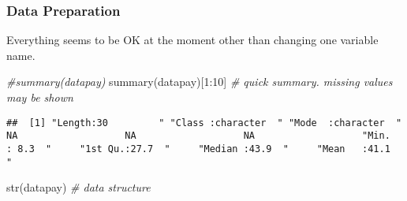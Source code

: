 \documentclass[
]{article}
\newenvironment{Shaded}{\begin{snugshade}}{\end{snugshade}}
\newcommand{\CommentTok}[1]{\textcolor[rgb]{0.56,0.35,0.01}{\textit{#1}}}
\newcommand{\DecValTok}[1]{\textcolor[rgb]{0.00,0.00,0.81}{#1}}
\newcommand{\FunctionTok}[1]{\textcolor[rgb]{0.00,0.00,0.00}{#1}}
\newcommand{\NormalTok}[1]{#1}
\newcommand{\SpecialCharTok}[1]{\textcolor[rgb]{0.00,0.00,0.00}{#1}}
\begin{document}
\frametitle{Data Preparation}

Everything seems to be OK at the moment other than changing one variable
name.\\
\tiny

\begin{Shaded}
\begin{Highlighting}[]
\CommentTok{\#summary(datapay)}
\FunctionTok{summary}\NormalTok{(datapay)[}\DecValTok{1}\SpecialCharTok{:}\DecValTok{10}\NormalTok{] }\CommentTok{\# quick summary. missing values may be shown}
\end{Highlighting}
\end{Shaded}

\begin{verbatim}
##  [1] "Length:30         " "Class :character  " "Mode  :character  " NA                   NA                   NA                   "Min.   : 8.3  "     "1st Qu.:27.7  "     "Median :43.9  "     "Mean   :41.1  "
\end{verbatim}

\begin{Shaded}
\begin{Highlighting}[]
\FunctionTok{str}\NormalTok{(datapay) }\CommentTok{\# data structure}
\end{Highlighting}
\end{Shaded}
\end{document}
